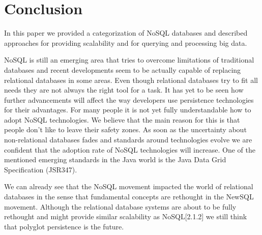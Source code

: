 \documentclass{sig-alternate}
\begin{document}
\section{Conclusion}
In this paper we provided a categorization of NoSQL databases and described approaches for providing scalability and for querying and processing big data.

NoSQL is still an emerging area that tries to overcome limitations of traditional databases and recent developments seem to be actually capable of replacing relational databases in some areas. Even though relational databases try to fit all needs they are not always the right tool for a task. It has yet to be seen how further advancements will affect the way developers use persistence technologies for their advantages. For many people it is not yet fully understandable how to adopt NoSQL technologies. We believe that the main reason for this is that people don't like to leave their safety zones. As soon as the uncertainty about non-relational databases fades and standards around technologies evolve we are confident that the adoption rate of NoSQL technologies will increase. One of the mentioned emerging standards in the Java world is the Java Data Grid Specification (JSR347).

We can already see that the NoSQL movement impacted the world of relational databases in the sense that fundamental concepts are rethought in the NewSQL movement. Although the relational database systems are about to be fully rethought and might provide similar scalability as NoSQL\cite{strauch:nosql}[2.1.2] we still think that polyglot persistence is the future\cite{fowler:polyglot}.


 
\end{document}
